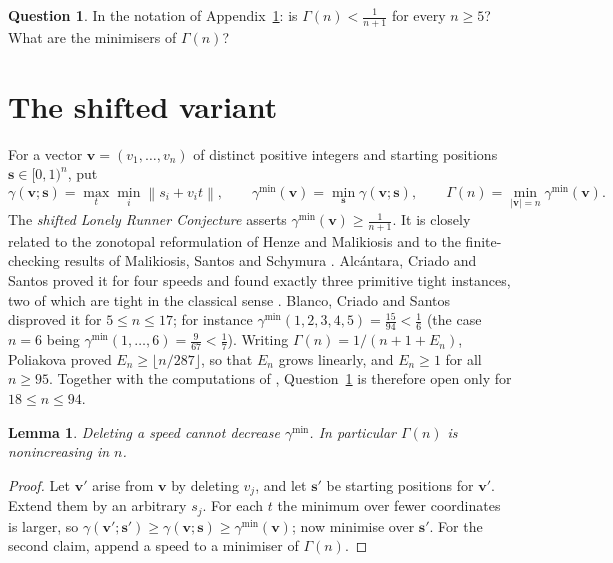 \documentclass[11pt]{article}
\newtheorem{lemma}[theorem]{Lemma}
\theoremstyle{definition}
\newtheorem{question}[theorem]{Question}
\newcommand{\norm}[1]{\left\lVert #1 \right\rVert}
\begin{document}
\begin{question}\label{q:shifted}
In the notation of Appendix~\ref{sec:shifted}: is
$\Gamma(n)<\frac1{n+1}$ for every $n\ge5$? What are the minimisers of
$\Gamma(n)$?
\end{question}

\appendix
\section{The shifted variant}\label{sec:shifted}

For a vector $\mathbf v=(v_1,\dots,v_n)$ of distinct positive integers
and starting positions $\mathbf s\in[0,1)^n$, put
\[
\gamma(\mathbf v;\mathbf s)=\max_{t}\min_{i}\norm{s_i+v_it},\qquad
\gamma^{\min}(\mathbf v)=\min_{\mathbf s}\gamma(\mathbf v;\mathbf s),
\qquad
\Gamma(n)=\min_{\lvert\mathbf v\rvert=n}\gamma^{\min}(\mathbf v).
\]
The \emph{shifted Lonely Runner Conjecture}
\cite[Conj.~1]{BeckHostenSchymura2019} asserts
$\gamma^{\min}(\mathbf v)\ge\frac1{n+1}$. It is closely related to the
zonotopal reformulation of Henze and Malikiosis \cite{HenzeMalikiosis2017}
and to the finite-checking results of Malikiosis, Santos and Schymura
\cite{MalikiosisSantosSchymura2025}. Alc\'antara, Criado and Santos
proved it for four speeds and found exactly three primitive tight
instances, two of which are tight in the classical sense
\cite{AlcantaraCriadoSantos2026}. Blanco, Criado and Santos disproved it
for $5\le n\le17$; for instance
$\gamma^{\min}(1,2,3,4,5)=\frac{15}{94}<\frac16$
\cite{BlancoCriadoSantos2026} (the case $n=6$ being
$\gamma^{\min}(1,\dots,6)=\frac9{67}<\frac17$).
Writing $\Gamma(n)=1/(n+1+E_n)$, Poliakova \cite{Poliakova2026} proved
$E_n\ge\lfloor n/287\rfloor$, so that $E_n$ grows linearly, and
$E_n\ge1$ for all $n\ge95$. Together with the computations of
\cite{BlancoCriadoSantos2026}, Question~\ref{q:shifted} is therefore
open only for $18\le n\le94$.

\begin{lemma}\label{lem:shiftmono}
Deleting a speed cannot decrease $\gamma^{\min}$. In particular
$\Gamma(n)$ is nonincreasing in $n$.
\end{lemma}

\begin{proof}
Let $\mathbf v'$ arise from $\mathbf v$ by deleting $v_j$, and let
$\mathbf s'$ be starting positions for $\mathbf v'$. Extend them by an
arbitrary $s_j$. For each $t$ the minimum over fewer coordinates is
larger, so $\gamma(\mathbf v';\mathbf s')\ge\gamma(\mathbf v;\mathbf s)
\ge\gamma^{\min}(\mathbf v)$; now minimise over $\mathbf s'$. For the
second claim, append a speed to a minimiser of $\Gamma(n)$.
\end{proof}
\end{document}
